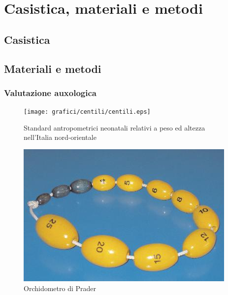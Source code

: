 \chapter{Casistica, materiali e metodi}

\section{Casistica}

\section{Materiali e metodi}

\subsection{Valutazione auxologica}

\begin{figure}[h]
  \begin{center}
      \texttt{[image: grafici/centili/centili.eps]} %
  \end{center}
  \caption{Standard antropometrici neonatali relativi a peso ed altezza nell'Italia nord-orientale}
\end{figure}

\begin{figure}[h]
  \begin{center}
	\includegraphics[scale=0.75]{grafici/orchidometro.jpg}
  \end{center}
  \caption{Orchidometro di Prader}
\end{figure}

